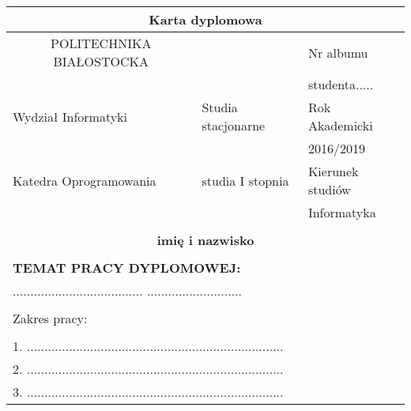 \begin{titlepage}
\oddsidemargin -0.3in
\topmargin     -0.5in
\noindent
\begin{tabular}{cccccc}
\multicolumn{6}{c}{\textbf{Karta dyplomowa}}\\\hline

\multicolumn{2}{|c|}{POLITECHNIKA BIAŁOSTOCKA}&\multicolumn{2}{|c|}{}&\multicolumn{2}{|l|}{Nr albumu}\\

\multicolumn{2}{|l|}{}&\multicolumn{2}{|c|}{}&\multicolumn{2}{|l|}{studenta.....}\\
\cline{5-6}

\multicolumn{2}{|l|}{Wydział Informatyki}&\multicolumn{2}{|l|}{Studia stacjonarne}&\multicolumn{2}{|l|}{Rok Akademicki}\\

\multicolumn{2}{|l|}{}&\multicolumn{2}{|l|}{}&\multicolumn{2}{|l|}{2016/2019}\\
\cline{5-6}

\multicolumn{2}{|l|}{Katedra Oprogramowania}&\multicolumn{2}{|l|}{studia I stopnia}&\multicolumn{2}{|l|}{Kierunek studiów}\\

\multicolumn{2}{|l|}{}&\multicolumn{2}{|c|}{}&\multicolumn{2}{|l|}{Informatyka}\\


\hline

\multicolumn{6}{|c|}{}\\
\multicolumn{6}{|c|}{\textbf{imię i nazwisko}}\\

\multicolumn{6}{|c|}{}\\
\multicolumn{6}{|l|}{\textbf{TEMAT PRACY DYPLOMOWEJ:}}\\
\multicolumn{6}{|l|}{..................................... ...........................}\\

\multicolumn{6}{|c|}{}\\
\multicolumn{6}{|l|}{Zakres pracy:}\\

\multicolumn{6}{|l|}{}\\
\multicolumn{6}{|l|}{1. .........................................................................}\\
\multicolumn{6}{|l|}{2. .........................................................................}\\
\multicolumn{6}{|l|}{3. .........................................................................}\\


\end{tabular}
\end{titlepage}
